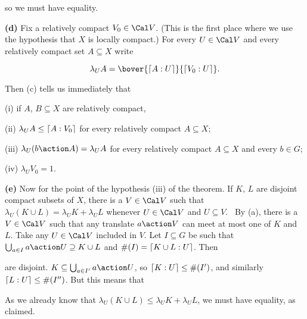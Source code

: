 {

\noindent so we must have equality.\ \Qed

\medskip

{\bf (d)} Fix a relatively compact $V_0\in\Cal V$.   (This is the first
place where we use the hypothesis that $X$ is locally compact.)   For
every $U\in\Cal V$ and every relatively compact set $A\subseteq X$ write

$$\lambda_UA=\bover{\high{A:U}}{\high{V_0:U}}.$$

\noindent Then (c) tells us immediately that

\quad(i) if $A$, $B\subseteq X$ are relatively compact,


\quad(ii) $\lambda_UA\le\lceil A:V_0\rceil$ for every relatively compact
$A\subseteq X$;

\quad(iii) $\lambda_U(b\action A)=\lambda_UA$ for every relatively
compact $A\subseteq X$ and every $b\in G$;

\quad(iv) $\lambda_UV_0=1$.

\medskip

{\bf (e)} Now for the point of the hypothesis (iii) of the theorem.   If
$K$, $L$ are disjoint compact subsets of $X$, there is a $V\in\Cal V$
such that $\lambda_U(K\cup L)=\lambda_UK+\lambda_UL$ whenever
$U\in\Cal V$ and $U\subseteq V$.   \Prf\ By (a), there is a $V\in\Cal V$
such that
any translate $a\action V$ can meet at most one of $K$ and $L$.   Take
any $U\in\Cal V$ included in $V$.   Let $I\subseteq G$ be such that
$\bigcup_{a\in I}a\action U\supseteq K\cup L$ and
$\#(I)=\lceil K\cup L:U\rceil$.   Then


\noindent are disjoint.  $K\subseteq\bigcup_{a\in I'}a\action U$, so
$\lceil K:U\rceil\le\#(I')$, and similarly $\lceil L:U\rceil\le\#(I'')$.   But this
means that



\noindent As we already know that
$\lambda_U(K\cup L)\le\lambda_UK+\lambda_UL$, we must have equality, as
claimed.\ \Qed

\medskip

}
